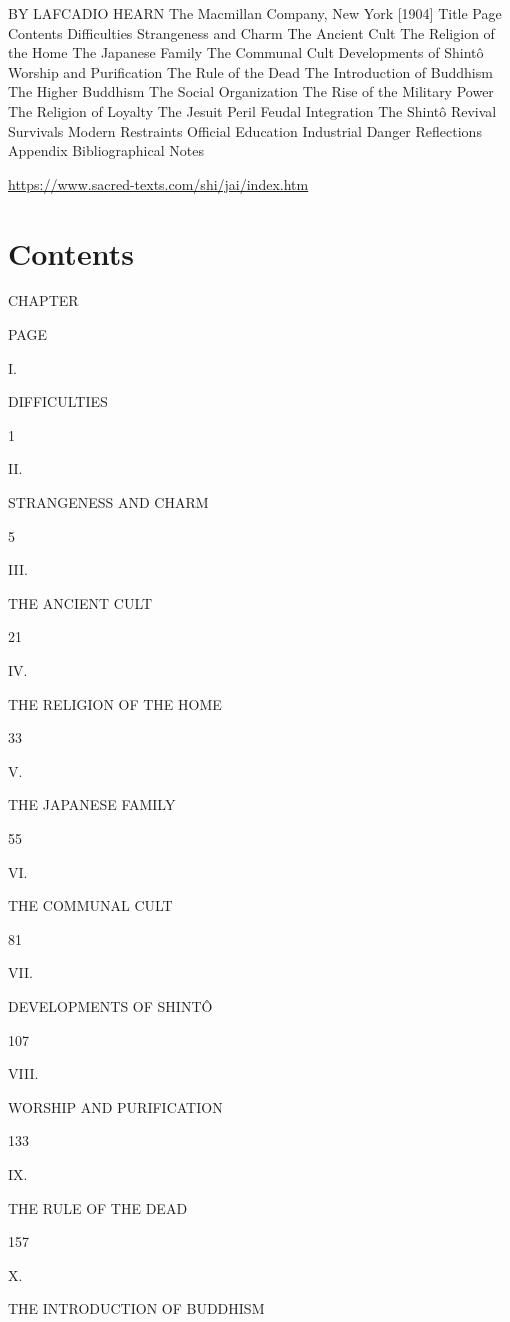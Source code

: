 \noindent
BY
LAFCADIO HEARN
The Macmillan Company, New York [1904]
Title Page
Contents
Difficulties
Strangeness and Charm
The Ancient Cult
The Religion of the Home
The Japanese Family
The Communal Cult
Developments of Shintô
Worship and Purification
The Rule of the Dead
The Introduction of Buddhism
The Higher Buddhism
The Social Organization
The Rise of the Military Power
The Religion of Loyalty
The Jesuit Peril
Feudal Integration
The Shintô Revival
Survivals
Modern Restraints
Official Education
Industrial Danger
Reflections
Appendix
Bibliographical Notes

\url{https://www.sacred-texts.com/shi/jai/index.htm}

\section{Contents}
\label{sec:orge9f3c79}

CHAPTER





PAGE

I.


DIFFICULTIES


1

II.


STRANGENESS AND CHARM


5

III.


THE ANCIENT CULT


21

IV.


THE RELIGION OF THE HOME


33

V.


THE JAPANESE FAMILY


55

VI.


THE COMMUNAL CULT


81

VII.


DEVELOPMENTS OF SHINTÔ


107

VIII.


WORSHIP AND PURIFICATION


133

IX.


THE RULE OF THE DEAD


157

X.


THE INTRODUCTION OF BUDDHISM



